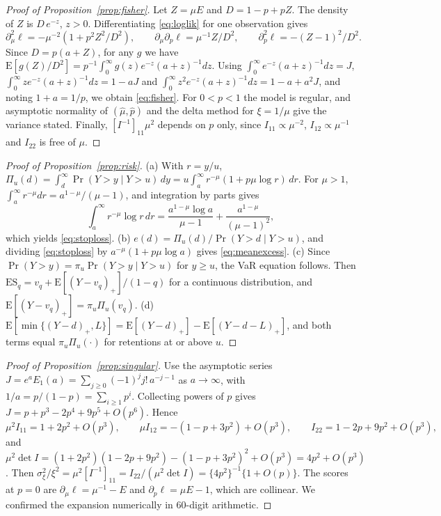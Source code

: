 \documentclass[12pt]{article}
\theoremstyle{definition}
\theoremstyle{remark}
\newcommand{\E}{\mathrm{E}}
\begin{document}
\begin{proof}[Proof of Proposition~\ref{prop:fisher}]
Let $Z=\mu E$ and $D=1-p+pZ$. The density of $Z$ is $D\,e^{-z}$, $z>0$. Differentiating \eqref{eq:loglik} for one observation gives
\[
\partial_\mu^2\ell=-\mu^{-2}(1+p^2Z^2/D^2),\qquad \partial_\mu\partial_p\ell=\mu^{-1}Z/D^2,\qquad \partial_p^2\ell=-(Z-1)^2/D^2 .
\]
Since $D=p(a+Z)$, for any $g$ we have $\E[g(Z)/D^2]=p^{-1}\int_0^\infty g(z)e^{-z}(a+z)^{-1}dz$. Using $\int_0^\infty e^{-z}(a+z)^{-1}dz=J$, $\int_0^\infty ze^{-z}(a+z)^{-1}dz=1-aJ$ and $\int_0^\infty z^2e^{-z}(a+z)^{-1}dz=1-a+a^2J$, and noting $1+a=1/p$, we obtain \eqref{eq:fisher}. For $0<p<1$ the model is regular, and asymptotic normality of $(\hat\mu,\hat p)$ and the delta method for $\xi=1/\mu$ give the variance stated. Finally, $[I^{-1}]_{11}\mu^2$ depends on $p$ only, since $I_{11}\propto\mu^{-2}$, $I_{12}\propto\mu^{-1}$ and $I_{22}$ is free of $\mu$.
\end{proof}

\begin{proof}[Proof of Proposition~\ref{prop:risk}]
(a) With $r=y/u$, $\Pi_u(d)=\int_d^\infty\Pr(Y>y\mid Y>u)\,dy=u\int_a^\infty r^{-\mu}(1+p\mu\log r)\,dr$. For $\mu>1$, $\int_a^\infty r^{-\mu}dr=a^{1-\mu}/(\mu-1)$, and integration by parts gives
\[
\int_a^\infty r^{-\mu}\log r\,dr=\frac{a^{1-\mu}\log a}{\mu-1}+\frac{a^{1-\mu}}{(\mu-1)^2},
\]
which yields \eqref{eq:stoploss}. (b) $e(d)=\Pi_u(d)/\Pr(Y>d\mid Y>u)$, and dividing \eqref{eq:stoploss} by $a^{-\mu}(1+p\mu\log a)$ gives \eqref{eq:meanexcess}. (c) Since $\Pr(Y>y)=\pi_u\Pr(Y>y\mid Y>u)$ for $y\ge u$, the VaR equation follows. Then $\mathrm{ES}_q=v_q+\E[(Y-v_q)_+]/(1-q)$ for a continuous distribution, and $\E[(Y-v_q)_+]=\pi_u\Pi_u(v_q)$. (d) $\E[\min\{(Y-d)_+,L\}]=\E[(Y-d)_+]-\E[(Y-d-L)_+]$, and both terms equal $\pi_u\Pi_u(\cdot)$ for retentions at or above $u$.
\end{proof}

\begin{proof}[Proof of Proposition~\ref{prop:singular}]
Use the asymptotic series $J=e^aE_1(a)=\sum_{j\ge0}(-1)^jj!\,a^{-j-1}$ as $a\to\infty$, with $1/a=p/(1-p)=\sum_{i\ge1}p^i$. Collecting powers of $p$ gives $J=p+p^3-2p^4+9p^5+O(p^6)$. Hence
\[
\mu^2I_{11}=1+2p^2+O(p^3),\qquad \mu I_{12}=-(1-p+3p^2)+O(p^3),\qquad I_{22}=1-2p+9p^2+O(p^3),
\]
and $\mu^2\det I=(1+2p^2)(1-2p+9p^2)-(1-p+3p^2)^2+O(p^3)=4p^2+O(p^3)$. Then $\sigma^2_\xi/\xi^2=\mu^2[I^{-1}]_{11}=I_{22}/(\mu^2\det I)=\{4p^2\}^{-1}\{1+O(p)\}$. The scores at $p=0$ are $\partial_\mu\ell=\mu^{-1}-E$ and $\partial_p\ell=\mu E-1$, which are collinear. We confirmed the expansion numerically in 60-digit arithmetic.
\end{proof}
\end{document}
